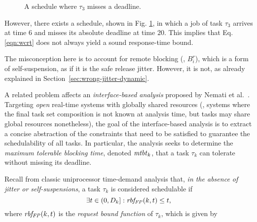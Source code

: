\begin{figure}[t]
{}       
\caption{A schedule where $\tau_3$ misses a deadline.}
\label{fig:counterexample_protocol}
\end{figure}

\ifpaper
 \fi

However, there exists a schedule, shown in Fig. \ref{fig:counterexample_protocol}, in which a job of task $\tau_3$ arrives at time $6$ and misses its absolute deadline at time $20$. This implies that Eq. \eqref{eqn:wcrt} does not always yield a sound response-time bound. 

The misconception here is to account for remote blocking (\ie, $B_i^r$), which is a form of self-suspension, as if it is the safe release jitter. However, it is not, as already explained in Section~\ref{sec:wrong-jitter-dynamic}.


A related problem affects an \emph{interface-based analysis}  proposed by Nemati et al.~\cite{NBN:11}. Targeting \emph{open} real-time systems with globally shared resources (\ie, systems where the final task set composition is not known at analysis time, but tasks may share global resources nonetheless), the goal of the interface-based analysis is to extract a concise abstraction of the constraints that need to be satisfied  to guarantee the schedulability of all tasks. In particular, the analysis seeks to determine the \emph{maximum tolerable blocking time}, denoted $\mathit{mtbt}_k$, that a task $\tau_k$ can tolerate without missing its deadline. 

Recall from classic uniprocessor time-demand analysis \cite{lehoczky-1989} that, \emph{in the absence of jitter or self-suspensions}, a task $\tau_k$ is considered schedulable if
\begin{equation}
\label{eqn:rbf-1}
\exists t \in (0,D_k]: \mathit{rbf_{FP}}(k,t) \leq t, 
\end{equation}
where $\mathit{rbf_{FP}}(k,t)$ is the \emph{request bound function} of $\tau_k$, which is given by

